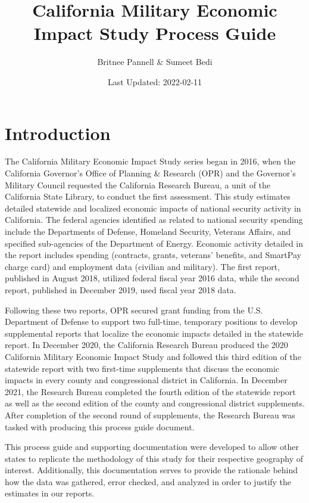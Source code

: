 \documentclass[
]{book}
\title{California Military Economic Impact Study Process Guide}
\author{Britnee Pannell \& Sumeet Bedi}
\date{Last Updated: 2022-02-11}
\begin{document}
\maketitle

{
\setcounter{tocdepth}{1}
\tableofcontents
}
\hypertarget{introduction}{%
\chapter{Introduction}\label{introduction}}

The California Military Economic Impact Study series began in 2016, when the California Governor's Office of Planning \& Research (OPR) and the Governor's Military Council requested the California Research Bureau, a unit of the California State Library, to conduct the first assessment. This study estimates detailed statewide and localized economic impacts of national security activity in California. The federal agencies identified as related to national security spending include the Departments of Defense, Homeland Security, Veterans Affairs, and specified sub-agencies of the Department of Energy. Economic activity detailed in the report includes spending (contracts, grants, veterans' benefits, and SmartPay charge card) and employment data (civilian and military). The first report, published in August 2018, utilized federal fiscal year 2016 data, while the second report, published in December 2019, used fiscal year 2018 data.

Following these two reports, OPR secured grant funding from the U.S. Department of Defense to support two full-time, temporary positions to develop supplemental reports that localize the economic impacts detailed in the statewide report. In December 2020, the California Research Bureau produced the 2020 California Military Economic Impact Study and followed this third edition of the statewide report with two first-time supplements that discuss the economic impacts in every county and congressional district in California. In December 2021, the Research Bureau completed the fourth edition of the statewide report as well as the second edition of the county and congressional district supplements. After completion of the second round of supplements, the Research Bureau was tasked with producing this process guide document.

This process guide and supporting documentation were developed to allow other states to replicate the methodology of this study for their respective geography of interest. Additionally, this documentation serves to provide the rationale behind how the data was gathered, error checked, and analyzed in order to justify the estimates in our reports.
\end{document}
